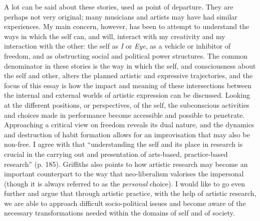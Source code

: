 \documentclass[a4paper]{article}
\begin{document}
A lot can be said about these stories, used as point of departure. They are perhaps not very original; many musicians and artists may have had similar experiences. My main concern, however, has been to attempt to understand the ways in which the self can, and will, interact with my creativity and my interaction with the other: the self as \emph{I} or \emph{Eye}, as a vehicle or inhibitor of freedom, and as obstructing social and political power structures. The common denominator in these stories is the way in which the self, and consciousness about the self and other, alters the planned artistic and expressive trajectories, and the focus of this essay is how the impact and meaning of these intersections between the internal and external worlds of artistic expression can be discussed. Looking at the different positions, or perspectives, of the self, the subconscious activities and choices made in performance become accessible and possible to penetrate. Approaching a critical view on freedom reveals its dual nature, and the dynamics and destruction of habit formation allows for an improvisation that may also be non-free. I agree with \citet{griffiths10} that ``understanding the self and its place in research is crucial in the carrying out and presentation of arts-based, practice-based research'' (p. 185). Griffiths also points to how artistic research may become an important counterpart to the way that neo-liberalism valorises the impersonal (though it is always referred to as the \emph{personal} choice). I would like to go even further and argue that through artistic practice, with the help of artistic research, we are able to approach difficult socio-political issues and become aware of the necessary transformations needed within the domains of self and of society.
\end{document}
